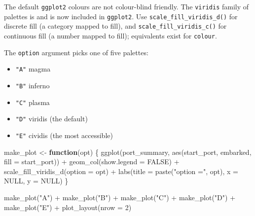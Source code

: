 \documentclass[
  english,
  letterpaper,
]{book}
\newenvironment{Shaded}{\begin{snugshade}}{\end{snugshade}}
\newcommand{\AttributeTok}[1]{\textcolor[rgb]{0.40,0.45,0.13}{#1}}
\newcommand{\ConstantTok}[1]{\textcolor[rgb]{0.56,0.35,0.01}{#1}}
\newcommand{\ControlFlowTok}[1]{\textcolor[rgb]{0.00,0.23,0.31}{\textbf{#1}}}
\newcommand{\DecValTok}[1]{\textcolor[rgb]{0.68,0.00,0.00}{#1}}
\newcommand{\FunctionTok}[1]{\textcolor[rgb]{0.28,0.35,0.67}{#1}}
\newcommand{\NormalTok}[1]{\textcolor[rgb]{0.00,0.23,0.31}{#1}}
\newcommand{\OtherTok}[1]{\textcolor[rgb]{0.00,0.23,0.31}{#1}}
\newcommand{\SpecialCharTok}[1]{\textcolor[rgb]{0.37,0.37,0.37}{#1}}
\newcommand{\StringTok}[1]{\textcolor[rgb]{0.13,0.47,0.30}{#1}}
\providecommand{\tightlist}{%
  \setlength{\itemsep}{0pt}\setlength{\parskip}{0pt}}
\begin{document}
The default \texttt{ggplot2} colours are not colour-blind friendly. The
\texttt{viridis} family of palettes is and is now included in
\texttt{ggplot2}. Use \texttt{scale\_fill\_viridis\_d()} for discrete
fill (a category mapped to fill), and \texttt{scale\_fill\_viridis\_c()}
for continuous fill (a number mapped to fill); equivalents exist for
\texttt{colour}.

The \texttt{option} argument picks one of five palettes:

\begin{itemize}
\tightlist
\item
  \texttt{"A"} magma
\item
  \texttt{"B"} inferno
\item
  \texttt{"C"} plasma
\item
  \texttt{"D"} viridis (the default)
\item
  \texttt{"E"} cividis (the most accessible)
\end{itemize}

\begin{Shaded}
\begin{Highlighting}[]
\NormalTok{make\_plot }\OtherTok{\textless{}{-}} \ControlFlowTok{function}\NormalTok{(opt) \{}
  \FunctionTok{ggplot}\NormalTok{(port\_summary, }\FunctionTok{aes}\NormalTok{(start\_port, embarked, }\AttributeTok{fill =}\NormalTok{ start\_port)) }\SpecialCharTok{+}
    \FunctionTok{geom\_col}\NormalTok{(}\AttributeTok{show.legend =} \ConstantTok{FALSE}\NormalTok{) }\SpecialCharTok{+}
    \FunctionTok{scale\_fill\_viridis\_d}\NormalTok{(}\AttributeTok{option =}\NormalTok{ opt) }\SpecialCharTok{+}
    \FunctionTok{labs}\NormalTok{(}\AttributeTok{title =} \FunctionTok{paste}\NormalTok{(}\StringTok{"option ="}\NormalTok{, opt), }\AttributeTok{x =} \ConstantTok{NULL}\NormalTok{, }\AttributeTok{y =} \ConstantTok{NULL}\NormalTok{)}
\NormalTok{\}}

\FunctionTok{make\_plot}\NormalTok{(}\StringTok{"A"}\NormalTok{) }\SpecialCharTok{+} \FunctionTok{make\_plot}\NormalTok{(}\StringTok{"B"}\NormalTok{) }\SpecialCharTok{+} \FunctionTok{make\_plot}\NormalTok{(}\StringTok{"C"}\NormalTok{) }\SpecialCharTok{+}
  \FunctionTok{make\_plot}\NormalTok{(}\StringTok{"D"}\NormalTok{) }\SpecialCharTok{+} \FunctionTok{make\_plot}\NormalTok{(}\StringTok{"E"}\NormalTok{) }\SpecialCharTok{+}
  \FunctionTok{plot\_layout}\NormalTok{(}\AttributeTok{nrow =} \DecValTok{2}\NormalTok{)}
\end{Highlighting}
\end{Shaded}
\end{document}
